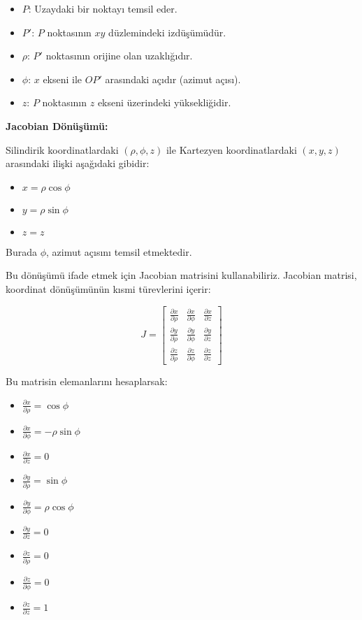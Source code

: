\documentclass[11pt,letterpaper,twocolumn]{fenbil}
\begin{document}
\begin{itemize}
    \item $P$: Uzaydaki bir noktayı temsil eder.
    \item $P'$: $P$ noktasının $xy$ düzlemindeki izdüşümüdür.
    \item $\rho$: $P'$ noktasının orijine olan uzaklığıdır.
    \item $\phi$: $x$ ekseni ile $OP'$ arasındaki açıdır (azimut açısı).
    \item $z$: $P$ noktasının $z$ ekseni üzerindeki yüksekliğidir.
\end{itemize}

\textbf{Jacobian Dönüşümü:}

Silindirik koordinatlardaki $(\rho, \phi, z)$ ile Kartezyen koordinatlardaki $(x, y, z)$ arasındaki ilişki aşağıdaki gibidir:

\begin{itemize}
    \item $x = \rho \cos \phi$
    \item $y = \rho \sin \phi$
    \item $z = z$
\end{itemize}

Burada $\phi$, azimut açısını temsil etmektedir.

Bu dönüşümü ifade etmek için Jacobian matrisini kullanabiliriz. Jacobian matrisi, koordinat dönüşümünün kısmi türevlerini içerir:

\begin{equation}
J = \begin{bmatrix}
\frac{\partial x}{\partial \rho} & \frac{\partial x}{\partial \phi} & \frac{\partial x}{\partial z} \\
\frac{\partial y}{\partial \rho} & \frac{\partial y}{\partial \phi} & \frac{\partial y}{\partial z} \\
\frac{\partial z}{\partial \rho} & \frac{\partial z}{\partial \phi} & \frac{\partial z}{\partial z}
\end{bmatrix}
\end{equation}

Bu matrisin elemanlarını hesaplarsak:

\begin{itemize}
    \item $\frac{\partial x}{\partial \rho} = \cos \phi$
    \item $\frac{\partial x}{\partial \phi} = -\rho \sin \phi$
    \item $\frac{\partial x}{\partial z} = 0$
    \item $\frac{\partial y}{\partial \rho} = \sin \phi$
    \item $\frac{\partial y}{\partial \phi} = \rho \cos \phi$
    \item $\frac{\partial y}{\partial z} = 0$
    \item $\frac{\partial z}{\partial \rho} = 0$
    \item $\frac{\partial z}{\partial \phi} = 0$
    \item $\frac{\partial z}{\partial z} = 1$
\end{itemize}
\end{document}
